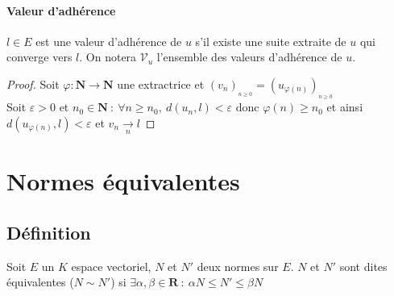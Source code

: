 		\paragraph{Valeur d'adhérence}
			$l\in E$ est une valeur d'adhérence de $u$ s'il existe une suite extraite de $u$ qui converge vers $l$.
			On notera $\mathcal{V}_u$ l'ensemble des valeurs d'adhérence de $u$. 
		\trait
		
		
		\begin{proof}
			Soit $\varphi : \mathbf{N} \rightarrow \mathbf{N}$ une extractrice et 
			$\left(v_n\right)_{_{n\geq 0}} = \left(u_{\varphi (n)} \right)_{_{n\geq 0}}$ \\
			Soit $\varepsilon >0$ et $ n_0 \in\mathbf{N} ~:~ \forall n\geq n_0 ,~d(u_n ,l)<\varepsilon$ 
			donc $\varphi (n) \geq n_0$ et ainsi $d\left( u_{\varphi (n)},l\right)<\varepsilon$ et $v_n \underset{n}{\rightarrow} l$
		\end{proof} \medskip

		
		\medskip 

\section{Normes équivalentes}
	
	\subsection{Définition}
		
	\vspace{-15pt}
		\traitd
			Soit $E$ un $K$ espace vectoriel, $N$ et $N'$ deux normes sur $E$.
			$N$ et $N'$ sont dites \\équivalentes ($N\sim N'$) si $\exists \alpha ,\beta \in \mathbf{R} ~:~ \alpha N \leq N'\leq \beta N$
		\trait

		\vspace{-10pt}
		
		 \medskip \\
		
